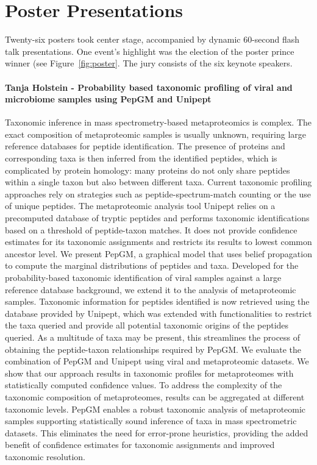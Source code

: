 \section{Poster Presentations}


Twenty-six posters took center stage, accompanied by dynamic 60-second flash talk presentations. One event's highlight was the election of the poster prince winner (see Figure~\ref{fig:poster}. The jury consists of the six keynote speakers.


\paragraph{Tanja Holstein - Probability based taxonomic profiling of viral and microbiome samples using PepGM and Unipept}

Taxonomic inference in mass spectrometry-based metaproteomics is complex. The exact composition of metaproteomic samples is usually unknown, requiring large reference databases for peptide identification. The presence of proteins and corresponding taxa is then inferred from the identified peptides, which is complicated by protein homology: many proteins do not only share peptides within a single taxon but also between different taxa. Current taxonomic profiling approaches rely on strategies such as peptide-spectrum-match counting or the use of unique peptides. The metaproteomic analysis tool Unipept relies on a precomputed database of tryptic peptides and performs taxonomic identifications based on a threshold of peptide-taxon matches. It does not provide confidence estimates for its taxonomic assignments and restricts its results to lowest common ancestor level.
We present PepGM, a graphical model that uses belief propagation to compute the marginal distributions of peptides and taxa. Developed for the probability-based taxonomic identification of viral samples against a large reference database background, we extend it to the analysis of metaproteomic samples. Taxonomic information for peptides identified is now retrieved using the database provided by Unipept, which was extended with functionalities to restrict the taxa queried and provide all potential taxonomic origins of the peptides queried.  As a multitude of taxa may be present, this streamlines the process of obtaining the peptide-taxon relationships required by PepGM.
We evaluate the combination of PepGM and Unipept using viral and metaproteomic datasets. We show that our approach results in taxonomic profiles for metaproteomes with statistically computed confidence values. To address the complexity of the taxonomic composition of metaproteomes, results can be aggregated at different taxonomic levels. PepGM enables a robust taxonomic analysis of metaproteomic samples supporting statistically sound inference of taxa in mass spectrometric datasets. This eliminates the need for error-prone heuristics, providing the added benefit of confidence estimates for taxonomic assignments and improved taxonomic resolution.

